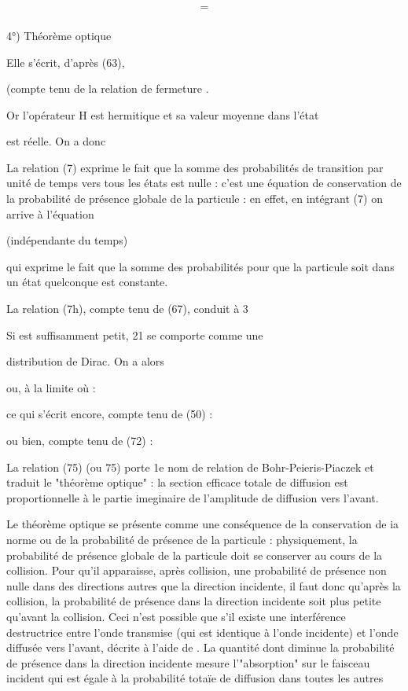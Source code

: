 {{{\[
\tag{73}=
\]

\subsubsection{}%
4°) Théorème optique

Elle s'écrit, d'après (63),

(compte tenu de la relation de fermeture .

Or l'opérateur H est hermitique et sa valeur moyenne dans l'état 

est réelle. On a donc

La relation (7) exprime le fait que la somme des probabilités
de transition par unité de temps vers tous les états  est nulle :
c'est une équation de conservation de la probabilité de présence globale
de la particule : en effet, en intégrant (7) on arrive à l'équation

 (indépendante du temps)

qui exprime le fait que la somme des probabilités pour que la particule
soit dans un état  quelconque est constante.

La relation (7h), compte tenu de (67), conduit à 3

Si  est suffisamment petit, 21 se comporte comme une

distribution de Dirac. On a alors


ou, à la limite où  :

ce qui s'écrit encore, compte tenu de (50) :

ou bien, compte tenu de (72) :

La relation (75) (ou 75) porte 1e nom de relation de
Bohr-Peieris-Piaczek et traduit le "théorème optique" : la section
efficace totale de diffusion est proportionnelle à le partie imeginaire de
l'amplitude de diffusion vers l'avant.

Le théorème optique se présente comme une conséquence
de la conservation de ia norme ou de la probabilité de présence de la
particule : physiquement, la probabilité de présence globale de la particule
doit se conserver au cours de la collision. Pour qu'il apparaisse,
après collision, une probabilité de présence non nulle dans des directions
autres que la direction incidente, il faut donc qu'après la collision, la
probabilité de présence dans la direction incidente soit plus petite
qu'avant la collision. Ceci n'est possible que s'il existe une interférence
destructrice entre l'onde transmise (qui est identique à l'onde
incidente) et l'onde diffusée vers l'avant, décrite à l'aide de
. La quantité dont diminue la probabilité de présence dans la
direction incidente mesure l'"absorption" sur le faisceau incident qui
est égale à la probabilité totaïe de diffusion dans toutes les autres

}}}
